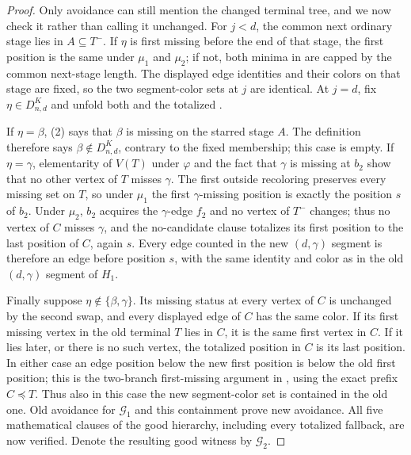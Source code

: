 \begin{proof}
Only avoidance can still mention the changed terminal tree, and we now
check it rather than calling it unchanged.  For $j<d$, the common next
ordinary stage lies in $A\subseteq T^-$.  If $\eta$ is first missing
before the end of that stage, the first position is the same under
$\mu_1$ and $\mu_2$; if not, both minima in
 are capped by the common next-stage
length.  The displayed edge identities and their colors on that stage
are fixed, so the two segment-color sets at $j$ are identical.  At
$j=d$, fix $\eta\in D^K_{n,d}$ and unfold both
 and the totalized
.

If $\eta=\beta$, (2) says that $\beta$ is missing on the starred stage
$A$.  The definition  therefore says
$\beta\notin D^K_{n,d}$, contrary to the fixed membership; this case is
empty.  If $\eta=\gamma$, elementarity of $V(T)$ under $\varphi$ and the
fact that $\gamma$ is missing at $b_2$ show that no other vertex of $T$
misses $\gamma$.  The first outside recoloring preserves every missing
set on $T$, so under $\mu_1$ the first $\gamma$-missing position is
exactly the position $s$ of $b_2$.  Under $\mu_2$, $b_2$ acquires the
$\gamma$-edge $f_2$ and no vertex of $T^-$ changes; thus no vertex of
$C$ misses $\gamma$, and the no-candidate clause totalizes its first
position to the last position of $C$, again $s$.  Every edge counted in
the new $(d,\gamma)$ segment is therefore an edge before position $s$,
with the same identity and color as in the old $(d,\gamma)$ segment of
$H_1$.

Finally suppose $\eta\notin\{\beta,\gamma\}$.  Its missing status at every
vertex of $C$ is unchanged by the second swap, and every displayed edge
of $C$ has the same color.  If its first missing vertex in the old
terminal $T$ lies in $C$, it is the same first vertex in $C$.  If it lies
later, or there is no such vertex, the totalized position in $C$ is its
last position.  In either case an edge position below the new first
position is below the old first position; this is the two-branch
first-missing argument in
, using the exact prefix
$C\preccurlyeq T$.  Thus also in this case the new segment-color set is
contained in the old one.  Old avoidance for $\mathcal G_1$ and this
containment prove new avoidance.  All five mathematical clauses of the
good hierarchy, including every totalized fallback, are now verified.
Denote the resulting good witness by $\mathcal G_2$.


\end{proof}
